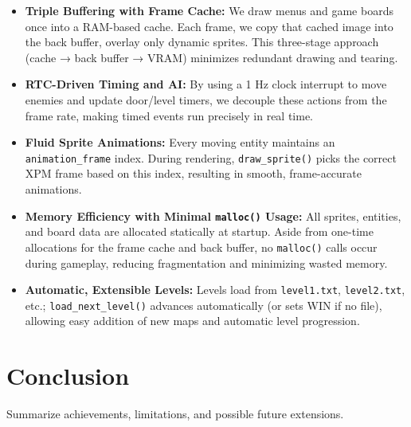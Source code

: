 \documentclass[12pt,a4paper]{article}
\begin{document}
\begin{itemize}[itemsep=0.5em]
  \item \textbf{Triple Buffering with Frame Cache:}  
    We draw menus and game boards once into a RAM-based cache. Each frame, we copy that cached image into the back buffer, overlay only dynamic sprites. This three-stage approach (cache → back buffer → VRAM) minimizes redundant drawing and tearing.

  \item \textbf{RTC-Driven Timing and AI:}  
    By using a 1 Hz clock interrupt to move enemies and update door/level timers, we decouple these actions from the frame rate, making timed events run precisely in real time.

  \item \textbf{Fluid Sprite Animations:}  
    Every moving entity maintains an \texttt{animation\_frame} index. During rendering, \texttt{draw\_sprite()} picks the correct XPM frame based on this index, resulting in smooth, frame-accurate animations.

  \item \textbf{Memory Efficiency with Minimal \texttt{malloc()} Usage:}  
    All sprites, entities, and board data are allocated statically at startup. Aside from one-time allocations for the frame cache and back buffer, no \texttt{malloc()} calls occur during gameplay, reducing fragmentation and minimizing wasted memory.

  \item \textbf{Automatic, Extensible Levels:}  
    Levels load from \texttt{level1.txt}, \texttt{level2.txt}, etc.; \texttt{load\_next\_level()} advances automatically (or sets WIN if no file), allowing easy addition of new maps and automatic level progression.
\end{itemize}


\section{Conclusion}
Summarize achievements, limitations, and possible future extensions.
\end{document}
